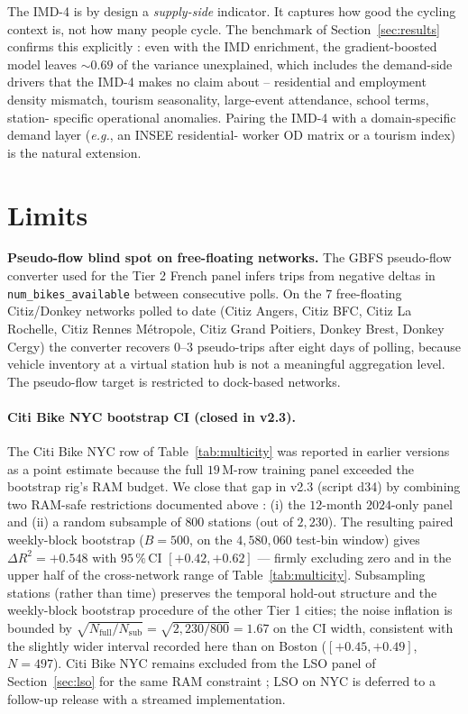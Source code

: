 \documentclass[11pt,a4paper]{article}
\begin{document}
The IMD-4 is by design a \emph{supply-side} indicator.  It
captures how good the cycling context is, not how many people
cycle.  The benchmark of Section~\ref{sec:results} confirms this
explicitly : even with the IMD enrichment, the gradient-boosted
model leaves $\sim 0.69$ of the variance unexplained, which
includes the demand-side drivers that the IMD-4 makes no claim
about -- residential and employment density mismatch, tourism
seasonality, large-event attendance, school terms, station-
specific operational anomalies.  Pairing the IMD-4 with a
domain-specific demand layer (\emph{e.g.}, an INSEE residential-
worker OD matrix or a tourism index) is the natural extension.

\section{Limits}
\label{sec:limits}

\textbf{Pseudo-flow blind spot on free-floating networks.}
The GBFS pseudo-flow converter used for the Tier 2 French
panel infers trips from negative deltas in
\texttt{num\_bikes\_available} between consecutive polls.  On
the $7$ free-floating Citiz/Donkey networks polled to date
(Citiz Angers, Citiz BFC, Citiz La Rochelle, Citiz Rennes
M\'etropole, Citiz Grand Poitiers, Donkey Brest, Donkey Cergy)
the converter recovers $0$--$3$ pseudo-trips after eight days of
polling, because vehicle inventory at a virtual station hub is
not a meaningful aggregation level.  The pseudo-flow target is
restricted to dock-based networks.

\paragraph{Citi Bike NYC bootstrap CI (closed in v2.3).}
\label{sec:nyc-supp}
The Citi Bike NYC row of Table~\ref{tab:multicity} was reported
in earlier versions as a point estimate because the full
$19$\,M-row training panel exceeded the bootstrap rig's RAM
budget.  We close that gap in v2.3 (script d34) by combining
two RAM-safe restrictions documented above : (i) the $12$-month
$2024$-only panel and (ii) a random subsample of $800$ stations
(out of $2{,}230$).  The resulting paired weekly-block bootstrap
($B = 500$, on the $4{,}580{,}060$ test-bin window) gives
$\Delta R^2 = +0.548$ with $95\,\%$\,CI $[+0.42, +0.62]$ —
firmly excluding zero and in the upper half of the cross-network
range of Table~\ref{tab:multicity}.  Subsampling stations
(rather than time) preserves the temporal hold-out structure
and the weekly-block bootstrap procedure of the other Tier 1
cities; the noise inflation is bounded by $\sqrt{N_{\text{full}}
/N_{\text{sub}}} = \sqrt{2{,}230/800} = 1.67$ on the CI width,
consistent with the slightly wider interval recorded here than
on Boston ($[+0.45, +0.49]$, $N = 497$).  Citi Bike NYC remains
excluded from the LSO panel of Section~\ref{sec:lso} for the
same RAM constraint ; LSO on NYC is deferred to a follow-up
release with a streamed implementation.
\end{document}
